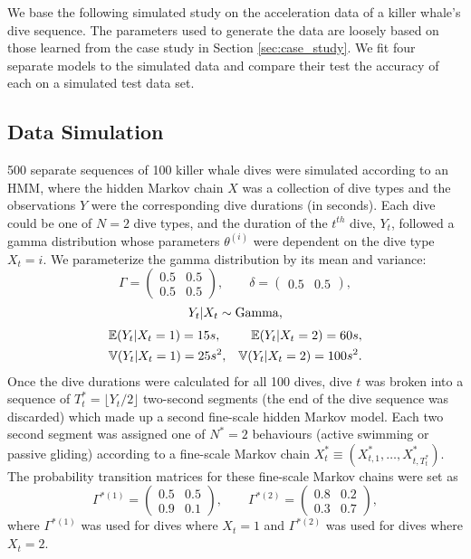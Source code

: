

We base the following simulated study on the acceleration data of a killer whale's dive sequence. The parameters used to generate the data are loosely based on those learned from the case study in Section \ref{sec:case_study}. We fit four separate models to the simulated data and compare their test the accuracy of each on a simulated test data set.

\subsection{Data Simulation}

500 separate sequences of 100 killer whale dives were simulated according to an HMM, where the hidden Markov chain $X$ was a collection of dive types and the observations $Y$ were the corresponding dive durations (in seconds). Each dive could be one of $N=2$ dive types, and the duration of the $t^{th}$ dive, $Y_t$, followed a gamma distribution whose parameters $\theta^{(i)}$ were dependent on the dive type $X_t = i$. We parameterize the gamma distribution by its mean and variance:
%
$$\Gamma = \begin{pmatrix} 0.5 & 0.5 \\ 0.5 & 0.5 \end{pmatrix}, \qquad \delta =  \begin{pmatrix} 0.5 & 0.5 \end{pmatrix},$$
$$Y_t|X_t \sim \rm{Gamma},$$
\begin{align*}
	&\mathbb{E}(Y_t|X_t = 1) = 15 s, &\mathbb{E}(Y_t|X_t = 2) = 60 s, \\
	&\mathbb{V}(Y_t|X_t = 1) = 25 s^2, &\mathbb{V}(Y_t|X_t = 2) = 100 s^2.
\end{align*}
%
Once the dive durations were calculated for all 100 dives, dive $t$ was broken into a sequence of $T^*_t = \lfloor Y_t/2 \rfloor$ two-second segments (the end of the dive sequence was discarded) which made up a second fine-scale hidden Markov model. Each two second segment was assigned one of $N^*=2$ behaviours (active swimming or passive gliding) according to a fine-scale Markov chain $X^*_t \equiv \left(X^*_{t,1}, \ldots, X^*_{t,T^*_t} \right)$. The probability transition matrices for these fine-scale Markov chains were set as
%
$$\Gamma^{*(1)} = \begin{pmatrix} 0.5 & 0.5 \\ 0.9 & 0.1 \end{pmatrix}, \qquad \Gamma^{*(2)} = \begin{pmatrix} 0.8 & 0.2 \\ 0.3 & 0.7 \end{pmatrix},$$ 
%
where $\Gamma^{*(1)}$ was used for dives where $X_t = 1$ and $\Gamma^{*(2)}$ was used for dives where $X_t = 2$. 

